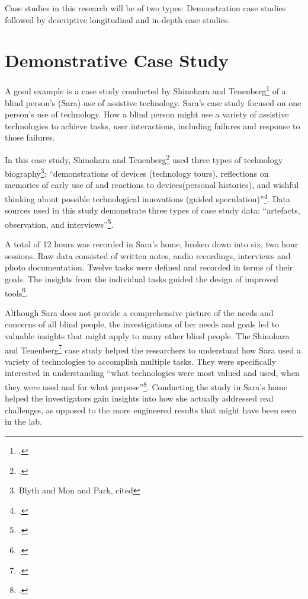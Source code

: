 Case studies in this research will be of two types: Demonstration case studies followed by descriptive longitudinal and in-depth case studies.

\section{Demonstrative Case Study}

A good example is a case study conducted by Shinohara and Tenenberg\footcite{Shinohara2009} of a blind person’s (Sara) use of assistive technology. Sara’s case study focused on one person’s use of technology. How a blind person might use a variety of assistive technologies to achieve tasks, user interactions, including failures and response to those failures.

In this case study, Shinohara and Tenenberg\footcite{Shinohara2009} used three types of technology biography\footnote{Blyth and Mon and Park, cited\cite{Cox2008}}: ``demonstrations of devices (technology tours), reflections on memories of early use of and reactions to devices(personal histories), and wishful thinking about possible technological innovations (guided speculation)''\footcite{Shinohara2009}. Data sources used in this study demonstrate three types of case study data: ``artefacts, observation, and interviews''\footcite{Shinohara2009}.

A total of 12 hours was recorded in Sara’s home, broken down into six, two hour sessions.  Raw data consisted of written notes, audio recordings, interviews and photo documentation.  Twelve tasks were defined and recorded in terms of their goals.  The insights from the individual tasks guided the design of improved tools\footcite{Shinohara2009}.

Although Sara does not provide a comprehensive picture of the needs and concerns of all blind people, the investigations of her needs and goals led to valuable insights that might apply to many other blind people.  The Shinohara and Tenenberg\footcite{Shinohara2009} case study helped the researchers to understand how Sara used a variety of technologies to accomplish multiple tasks.  They were specifically interested in understanding ``what technologies were most valued and used, when they were used and for what purpose''\footcite{Shinohara2009}. Conducting the study in Sara’s home helped the investigators gain insights into how she actually addressed real challenges, as opposed to the more engineered results that might have been seen in the lab.

